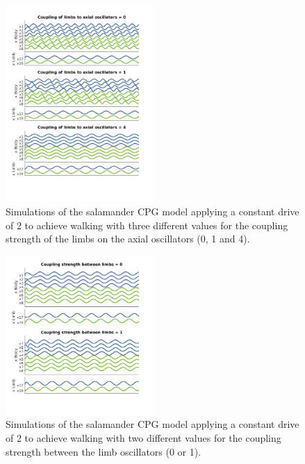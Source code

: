 \documentclass[a4paper]{scrartcl}
\begin{document}
{\begin{figure}[!h]
	\includegraphics[width=0.5\textwidth]{fig/figure7c_limbaxial-coupling.png}
	\vspace*{-1.5 cm}
	\caption{Simulations of the salamander CPG model applying a constant drive of 2 to achieve walking with three different values for the coupling strength of the limbs on the axial oscillators (0, 1 and 4).}
	\label{fig:7c-limbaxialcoupling}
\end{figure}

\begin{figure}[!h]
	\includegraphics[width=0.5\textwidth]{fig/figure7c_limb-coupling.png}
	\vspace*{-1.5 cm}
	\caption{Simulations of the salamander CPG model applying a constant drive of 2 to achieve walking with two different values for the coupling strength between the limb oscillators (0 or 1).}
	\label{fig:7c-limbcoupling}
\end{figure}

} %
\end{document}

